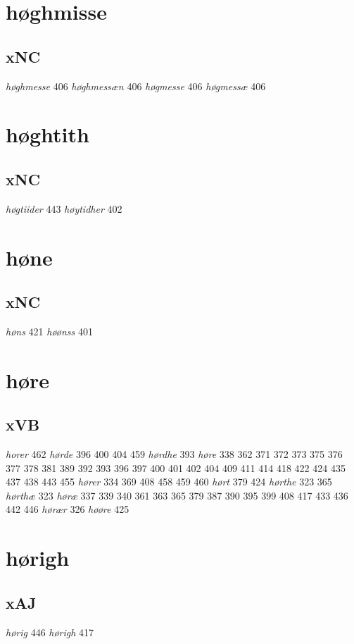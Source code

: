 \documentclass[a4paper,twocolumn]{article}
\begin{document}
\section{høghmisse}
\label{sec:orga2a9941}
\subsection{xNC}
\label{sec:org27461d7}
\emph{høghmesse} 406 \emph{høghmessæn} 406 \emph{høgmesse} 406 \emph{høgmessæ} 406 
\section{høghtith}
\label{sec:orgbfd1d79}
\subsection{xNC}
\label{sec:org8d05d82}
\emph{høgtiider} 443 \emph{høytidher} 402 
\section{høne}
\label{sec:orge34bd2b}
\subsection{xNC}
\label{sec:orgabda96b}
\emph{høns} 421 \emph{høønss} 401 
\section{høre}
\label{sec:org3046aa6}
\subsection{xVB}
\label{sec:org5fd72d7}
\emph{horer} 462 \emph{hørde} 396 400 404 459 \emph{hørdhe} 393 \emph{høre} 338 362 371 372 373 375 376 377 378 381 389 392 393 396 397 400 401 402 404 409 411 414 418 422 424 435 437 438 443 455 \emph{hører} 334 369 408 458 459 460 \emph{hørt} 379 424 \emph{hørthe} 323 365 \emph{hørthæ} 323 \emph{høræ} 337 339 340 361 363 365 379 387 390 395 399 408 417 433 436 442 446 \emph{hørær} 326 \emph{høøre} 425 
\section{hørigh}
\label{sec:orgf026e75}
\subsection{xAJ}
\label{sec:orge92702e}
\emph{hørig} 446 \emph{hørigh} 417 
\end{document}
